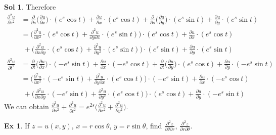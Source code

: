 \documentclass[12pt]{extarticle}
\newcommand{\ds}{\displaystyle}
\theoremstyle{definition}
\newtheorem*{ex}{Ex}
\newtheorem*{sol}{Sol}
\newcommand{\pdiff}[2]{\frac{\partial #1}{\partial #2}}
\newcommand{\pdifft}[2]{\frac{\partial^2 #1}{\partial #2^2}}
\begin{document}
\begin{sol}
  Therefore
  \begin{align*}
    \pdifft{u}{s} &= \pdiff{}{s}\bigg(\pdiff{u}{x}\bigg)\cdot(e^s\cos t) + \pdiff{u}{x}\cdot(e^s\cos t) + \pdiff{}{s}\bigg(\pdiff{u}{y}\bigg)\cdot(e^s\sin t) + \pdiff{u}{y}\cdot(e^s\sin t) \\
    &= \bigg(\pdifft{u}{x}\cdot(e^s\cos t) + \frac{\partial^2 u}{\partial y\partial x}\cdot(e^s\sin t)\bigg)\cdot(e^s\cos t) + \pdiff{u}{x}\cdot(e^s\cos t)\\
    &\;+ \bigg(\frac{\partial^2 u}{\partial x\partial y}\cdot(e^s\cos t) + \pdifft{u}{y}\cdot(e^s\sin t)\bigg)\cdot(e^s\sin t) + \pdiff{u}{y}\cdot(e^s\sin t)\\
    \pdifft{u}{t} &= \pdiff{}{t}\bigg(\pdiff{u}{x}\bigg)\cdot(-e^s\sin t) + \pdiff{u}{x}\cdot(-e^s\cos t) + \pdiff{}{t}\bigg(\pdiff{u}{y}\bigg)\cdot(e^s\cos t) + \pdiff{u}{y}\cdot(-e^s\sin t) \\ &= \bigg(\pdifft{u}{x}\cdot(-e^s\sin t) + \frac{\partial^2 u}{\partial y\partial x}\cdot(e^s\cos t)\bigg)\cdot(-e^s\sin t) + \pdiff{u}{x}\cdot(-e^s\cos t) \\ &\;+ \bigg(\frac{\partial^2 u}{\partial x\partial y}\cdot(-e^s\sin t) + \pdifft{u}{y}\cdot(e^s\cos t)\bigg)\cdot(e^s\cos t) + \pdiff{u}{y}\cdot(-e^s\sin t) 
  \end{align*}
  We can obtain $\ds\pdifft{u}{s} + \pdifft{u}{t} = e^{2s}\bigg(\pdifft{u}{x} + \pdifft{u}{y}\bigg)$. 
\end{sol}

\begin{ex}
  If $\ds z = u(x, y)$, $\ds x = r\cos\theta$, $\ds y = r\sin\theta$, find $\ds\frac{\partial^2 z}{\partial\theta\partial r}$, $\ds\frac{\partial^2 z}{\partial r\partial\theta}$. 
\end{ex}
\end{document}
